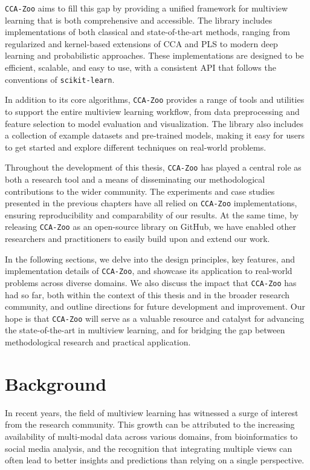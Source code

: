 \texttt{CCA-Zoo} aims to fill this gap by providing a unified framework for multiview learning that is both comprehensive and accessible. The library includes implementations of both classical and state-of-the-art methods, ranging from regularized and kernel-based extensions of CCA and PLS to modern deep learning and probabilistic approaches. These implementations are designed to be efficient, scalable, and easy to use, with a consistent API that follows the conventions of \texttt{scikit-learn}.

In addition to its core algorithms, \texttt{CCA-Zoo} provides a range of tools and utilities to support the entire multiview learning workflow, from data preprocessing and feature selection to model evaluation and visualization. The library also includes a collection of example datasets and pre-trained models, making it easy for users to get started and explore different techniques on real-world problems.

Throughout the development of this thesis, \texttt{CCA-Zoo} has played a central role as both a research tool and a means of disseminating our methodological contributions to the wider community. The experiments and case studies presented in the previous chapters have all relied on \texttt{CCA-Zoo} implementations, ensuring reproducibility and comparability of our results. At the same time, by releasing \texttt{CCA-Zoo} as an open-source library on GitHub, we have enabled other researchers and practitioners to easily build upon and extend our work.

In the following sections, we delve into the design principles, key features, and implementation details of \texttt{CCA-Zoo}, and showcase its application to real-world problems across diverse domains. We also discuss the impact that \texttt{CCA-Zoo} has had so far, both within the context of this thesis and in the broader research community, and outline directions for future development and improvement. Our hope is that \texttt{CCA-Zoo} will serve as a valuable resource and catalyst for advancing the state-of-the-art in multiview learning, and for bridging the gap between methodological research and practical application.

\section{Background}

In recent years, the field of multiview learning has witnessed a surge of interest from the research community. This growth can be attributed to the increasing availability of multi-modal data across various domains, from bioinformatics to social media analysis, and the recognition that integrating multiple views can often lead to better insights and predictions than relying on a single perspective.

